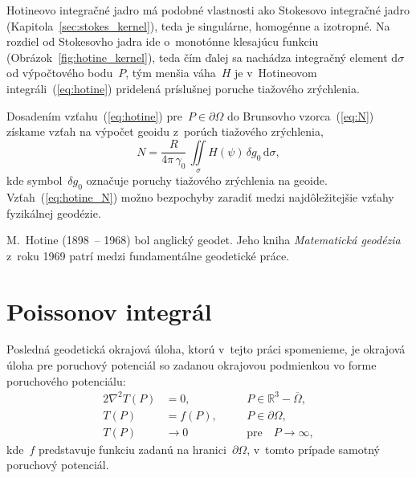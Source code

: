 \documentclass[a4paper, 12pt]{book}
\newcommand{\diff}{\mathrm d}
\begin{document}
Hotineovo integračné jadro má podobné vlastnosti ako Stokesovo integračné jadro 
(Kapitola~\ref{sec:stokes_kernel}), teda je singulárne, homogénne a izotropné.  
Na rozdiel od Stokesovho jadra ide o~monotónne klesajúcu funkciu 
(Obrázok~\ref{fig:hotine_kernel}), teda čím ďalej sa nachádza integračný 
element $\diff\sigma$ od výpočtového bodu~$P$, tým menšia váha~$H$ je 
v~Hotineovom integráli~(\ref{eq:hotine}) pridelená príslušnej poruche tiažového 
zrýchlenia.

Dosadením vzťahu~(\ref{eq:hotine}) pre~$P \in \partial\Omega$ do Brunsovho 
vzorca~(\ref{eq:N}) získame vzťah na výpočet geoidu z~porúch tiažového 
zrýchlenia,
%
\begin{equation}
\label{eq:hotine_N}
N = \frac{R}{4\pi \, \gamma_0} \, \iint\limits_{\sigma} H(\psi) \, \delta g_0 
\, \diff \sigma{,}
\end{equation}
%
kde symbol~$\delta g_0$ označuje poruchy tiažového zrýchlenia na geoide.  
Vzťah~(\ref{eq:hotine_N}) možno bezpochyby zaradiť medzi najdôležitejšie vzťahy 
fyzikálnej geodézie.

M.~Hotine (1898~-- 1968) bol anglický geodet.  Jeho kniha \textit{Matematická 
geodézia} z~roku 1969 patrí medzi fundamentálne geodetické práce.

\section{Poissonov integrál}
\label{sec:poisson_integral}

Posledná geodetická okrajová úloha, ktorú v~tejto práci spomenieme, je okrajová 
úloha pre poruchový potenciál so zadanou okrajovou podmienkou vo forme 
poruchového potenciálu:
%
\begin{alignat}{2}
\nabla^2 T(P) &= 0{,} &&P \in \mathbb{R}^3 
- \overline\Omega{,}\label{eq:bvp_t_laplace}\\
%
T(P) &= f(P){,} \quad &&P \in 
\partial\Omega{,}\label{eq:bvp_t_boundary_condition}\\
%
T(P) &\rightarrow 0 &&\textrm{pre} \quad P \rightarrow 
\infty{,}\label{eq:bvp_t_t_infty}
\end{alignat}
%
kde~$f$ predstavuje funkciu zadanú na hranici~$\partial\Omega$, v~tomto prípade 
samotný poruchový potenciál.
\end{document}
